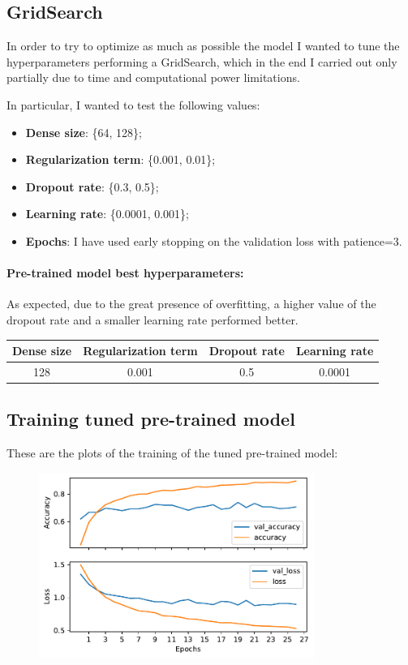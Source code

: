 \documentclass[a4paper]{article}
\begin{document}
\subsection{GridSearch}
In order to try to optimize as much as possible the model I wanted to tune the hyperparameters performing a GridSearch, which in the end I carried out only partially due to time and computational power limitations.

In particular, I wanted to test the following values:
\begin{itemize}
\item \textbf{Dense size}: \{64, 128\};
\item \textbf{Regularization term}: \{0.001, 0.01\};
\item \textbf{Dropout rate}: \{0.3, 0.5\};
\item \textbf{Learning rate}: \{0.0001, 0.001\};
\item \textbf{Epochs}: I have used early stopping on the validation loss with patience=3.
\end{itemize}
\paragraph{Pre-trained model best hyperparameters:}
As expected, due to the great presence of overfitting, a higher value of the dropout rate and a smaller learning rate performed better.
\begin{center}
\begin{tabular}{|c|c|c|c|} 
 \hline
 \textbf{Dense size} & \textbf{Regularization term} & \textbf{Dropout rate} & \textbf{Learning rate} \\ 
 \hline
 128 & 0.001 & 0.5 & 0.0001 \\ 
 \hline
\end{tabular}
\end{center}
\subsection{Training tuned pre-trained model}
These are the plots of the training of the tuned pre-trained model:
\begin{figure} [h!]
\centering
\includegraphics[width=0.8\textwidth]{pretrained_final_train.pdf}
\label{fig: pretrained_final_train}
\end{figure}
\end{document}

